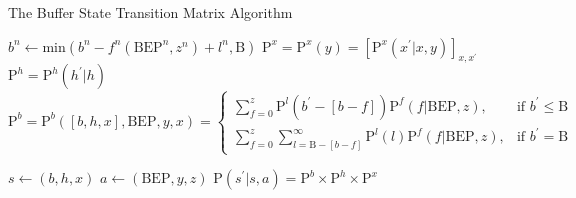 \documentclass[10pt,onecolumn]{article}
\begin{document}
\begin{algorithm}
  \caption{The Buffer State Transition Matrix Algorithm}
  \begin{algorithmic}[1]
    \State $b^n \gets \mathrm{min}(b^n - f^n(\mathrm{BEP}^n, z^n) + l^n, \mathrm{B})$
	\State $\mathrm{P}^x = \mathrm{P}^x(y) = [\mathrm{P}^x(x^{'} | x,y)]_{x, x^{'}}$
	\State $\mathrm{P}^h = \mathrm{P}^h(h^{'}|h)$
	\State $ \mathrm{P}^b = \mathrm{P}^b([b, h, x], \mathrm{BEP}, y, x) = 
  			\begin{cases}
    		\sum_{f=0}^{z} \mathrm{P}^l(b^{'} - [b-f]) \mathrm{P}^f(f|\mathrm{BEP}, z), &\text{if } b^{'} \leq \mathrm{B} \\
    		\sum_{f=0}^{z} \sum_{l=\mathrm{B}-[b-f]}^{\infty} \mathrm{P}^l (l) \mathrm{P}^f(f|\mathrm{BEP}, z), &\text{if } b^{'} = \mathrm{B}
    		\end{cases}$
  			
    \State $s \gets (b, h, x)$ 
    \State $a \gets (\mathrm{BEP}, y, z)$
    \State $\mathrm{P}(s^{'}|s, a) = \mathrm{P}^b \times \mathrm{P}^h \times \mathrm{P}^x$
  \end{algorithmic}
\end{algorithm}
\end{document}
